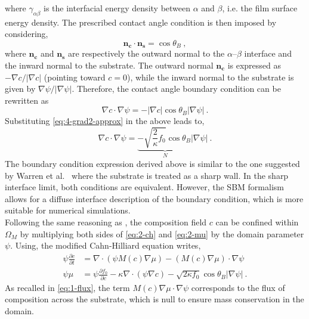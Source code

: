    where $\gamma_{\alpha\beta}$ is the interfacial energy density between $\alpha$ and $\beta$, i.e. the film surface energy density. The prescribed contact angle condition is then imposed by considering,
    \begin{equation}
        \mathbf{n_c}\cdot\mathbf{n_s} = \cos{\theta_B}\ ,
    \end{equation}
    where $\mathbf{n_c}$ and $\mathbf{n_s}$ are respectively the outward normal to the $\alpha$--$\beta$ interface and the inward normal to the substrate. The outward normal $\mathbf{n_c}$ is expressed as $-\nabla c / |\nabla c|$ (pointing toward $c=0$), while the inward normal to the substrate is given by $\nabla \psi / |\nabla \psi|$. Therefore, the contact angle boundary condition can be rewritten as
    \begin{equation}
        \nabla c \cdot \nabla \psi = - |\nabla c|\cos{\theta_B}|\nabla \psi|\ .
    \end{equation}
    Substituting \autoref{eq:4-grad2-approx} in the above leads to,
    \begin{equation}
        \nabla c \cdot \nabla \psi =\underbrace{-\sqrt{\frac{2}{\kappa} f_0} \cos{\theta_B}|}_{N}\nabla \psi| \ .
    \end{equation}
    The boundary condition expression derived above is similar to the one suggested by Warren et al.~\cite{WarrenPusztaiKornyeiGranasy2009} where the substrate is treated as a sharp wall. In the sharp interface limit, both conditions are equivalent. However, the SBM formalism allows for a diffuse interface description of the boundary condition, which is more suitable for numerical simulations.\\
    Following the same reasoning as \cite{YuChenThornton2012}, the composition field $c$ can be confined within $\Omega_M$ by multiplying both sides of \autoref{eq:2-ch} and \autoref{eq:2-mu} by the domain parameter $\psi$. Using, the modified Cahn-Hilliard equation writes,
    \begin{align}
        \psi \frac{\partial c}{\partial t} &= \nabla \cdot \left(\psi M(c) \nabla \mu \right) -  (M(c)\nabla\mu) \cdot \nabla \psi \\
        \psi \mu &= \psi \frac{\partial f_0}{\partial c} - \kappa \nabla \cdot \left(\psi \nabla c\right) - \sqrt{2 \kappa f_0} \cos{\theta_B} |\nabla \psi| \ .
    \end{align}
    As recalled in \autoref{eq:1-flux}, the term $M(c)\nabla\mu\cdot\nabla\psi$ corresponds to the flux of composition across the substrate, which is null to ensure mass conservation in the domain. 
